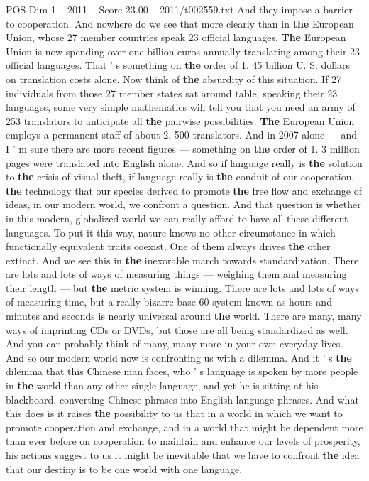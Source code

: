 \begin{textsample}{POS Dim 1 – 2011 – Score 23.00 – 2011/t002559.txt}
And they impose a barrier to cooperation.
And nowhere do we see that more clearly than in \textbf{the} European Union, whose 27 member countries speak 23 official languages. \textbf{The} European Union is now spending over one billion euros annually translating among their 23 official languages.
That ' s something on \textbf{the} order of 1. 45 billion U.
S. dollars on translation costs alone.
Now think of \textbf{the} absurdity of this situation.
If 27 individuals from those 27 member states sat around table, speaking their 23 languages, some very simple mathematics will tell you that you need an army of 253 translators to anticipate all \textbf{the} pairwise possibilities. \textbf{The} European Union employs a permanent staff of about 2, 500 translators.
And in 2007 alone — and I ' m sure there are more recent figures — something on \textbf{the} order of 1. 3 million pages were translated into English alone.
And so if language really is \textbf{the} solution to \textbf{the} crisis of visual theft, if language really is \textbf{the} conduit of our cooperation, \textbf{the} technology that our species derived to promote \textbf{the} free flow and exchange of ideas, in our modern world, we confront a question.
And that question is whether in this modern, globalized world we can really afford to have all these different languages.
To put it this way, nature knows no other circumstance in which functionally equivalent traits coexist.
One of them always drives \textbf{the} other extinct.
And we see this in \textbf{the} inexorable march towards standardization.
There are lots and lots of ways of measuring things — weighing them and measuring their length — but \textbf{the} metric system is winning.
There are lots and lots of ways of measuring time, but a really bizarre base 60 system known as hours and minutes and seconds is nearly universal around \textbf{the} world.
There are many, many ways of imprinting CDs or DVDs, but those are all being standardized as well.
And you can probably think of many, many more in your own everyday lives.
And so our modern world now is confronting us with a dilemma.
And it ' s \textbf{the} dilemma that this Chinese man faces, who ' s language is spoken by more people in \textbf{the} world than any other single language, and yet he is sitting at his blackboard, converting Chinese phrases into English language phrases.
And what this does is it raises \textbf{the} possibility to us that in a world in which we want to promote cooperation and exchange, and in a world that might be dependent more than ever before on cooperation to maintain and enhance our levels of prosperity, his actions suggest to us it might be inevitable that we have to confront \textbf{the} idea that our destiny is to be one world with one language.

\end{textsample}
